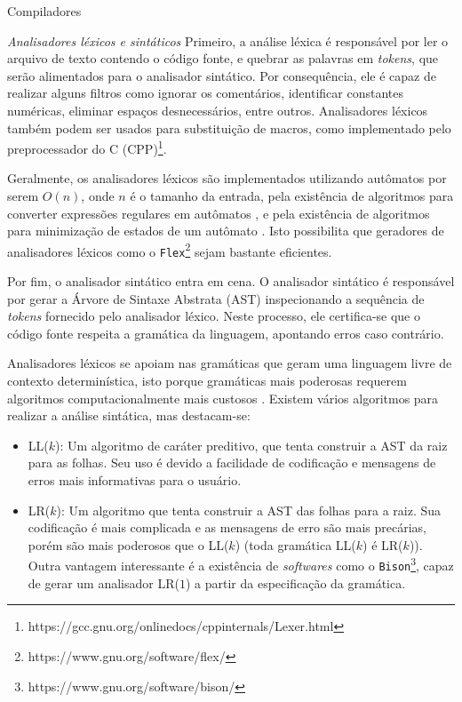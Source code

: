 \begin{section}{Compiladores}
\begin{subsection}{\textit{Analisadores léxicos e sintáticos}}
    Primeiro, a análise léxica é responsável por ler o arquivo
de texto contendo o código fonte, e quebrar as palavras em \textit{tokens}, que
serão alimentados para o analisador sintático. Por consequência, ele é capaz de
realizar alguns filtros como ignorar os comentários, identificar constantes
numéricas, eliminar espaços desnecessários,
entre outros. Analisadores léxicos também podem ser usados para substituição
de macros, como implementado pelo preprocessador do C
(CPP)\footnote{https://gcc.gnu.org/onlinedocs/cppinternals/Lexer.html}.

Geralmente, os analisadores léxicos são implementados utilizando autômatos por
serem $O(n)$, onde $n$ é o tamanho da entrada, pela existência de algoritmos
para converter expressões regulares em autômatos \citep{thompson}, e pela
existência de algoritmos para minimização de estados de um autômato
\citep{hopcroft1971n}. Isto possibilita que geradores de analisadores léxicos
como o \texttt{Flex}\footnote{https://www.gnu.org/software/flex/}
sejam bastante eficientes.

	Por fim, o analisador sintático entra em cena. O analisador sintático é
responsável por gerar a Árvore de Sintaxe Abstrata (AST) inspecionando a 
sequência de \textit{tokens} fornecido pelo analisador léxico. Neste processo,
ele certifica-se que o código fonte respeita a gramática da linguagem,
apontando erros caso contrário.

	Analisadores léxicos se apoiam nas gramáticas que geram uma
linguagem livre de contexto determinística, isto porque gramáticas mais
poderosas requerem algoritmos computacionalmente mais custosos
\citep{sipser2012}. Existem vários algoritmos para realizar a análise sintática,
mas destacam-se:
\begin{itemize}
    \item LL($k$): Um algoritmo de caráter preditivo, que tenta construir a AST da
        raiz para as folhas. Seu uso é devido a facilidade de codificação e
        mensagens de erros mais informativas para o usuário.

    \item LR($k$): Um algoritmo que tenta construir a AST das folhas para a raiz.
          Sua codificação é mais complicada e as mensagens de erro são mais
          precárias, porém são mais poderosos que o LL($k$) (toda gramática
          LL($k$) é LR($k$)). Outra vantagem interessante é a existência de
          \textit{softwares} como o
          \texttt{Bison}\footnote{https://www.gnu.org/software/bison/}, capaz
          de gerar um analisador LR($1$) a partir da especificação da gramática.
\end{itemize}


\end{subsection}
\end{section}
